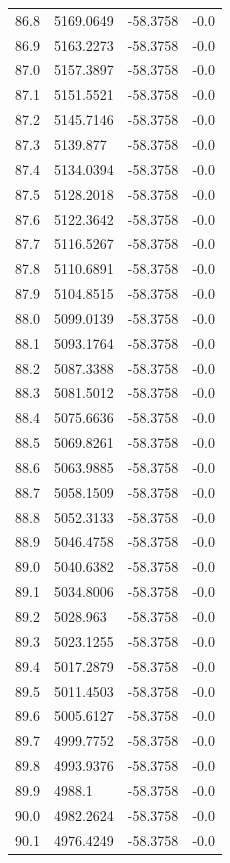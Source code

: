\begin{table}[H]
\begin{tabular}{llll}
86.8 & 5169.0649 & -58.3758 & -0.0 \\
86.9 & 5163.2273 & -58.3758 & -0.0 \\
87.0 & 5157.3897 & -58.3758 & -0.0 \\
87.1 & 5151.5521 & -58.3758 & -0.0 \\
87.2 & 5145.7146 & -58.3758 & -0.0 \\
87.3 & 5139.877 & -58.3758 & -0.0 \\
87.4 & 5134.0394 & -58.3758 & -0.0 \\
87.5 & 5128.2018 & -58.3758 & -0.0 \\
87.6 & 5122.3642 & -58.3758 & -0.0 \\
87.7 & 5116.5267 & -58.3758 & -0.0 \\
87.8 & 5110.6891 & -58.3758 & -0.0 \\
87.9 & 5104.8515 & -58.3758 & -0.0 \\
88.0 & 5099.0139 & -58.3758 & -0.0 \\
88.1 & 5093.1764 & -58.3758 & -0.0 \\
88.2 & 5087.3388 & -58.3758 & -0.0 \\
88.3 & 5081.5012 & -58.3758 & -0.0 \\
88.4 & 5075.6636 & -58.3758 & -0.0 \\
88.5 & 5069.8261 & -58.3758 & -0.0 \\
88.6 & 5063.9885 & -58.3758 & -0.0 \\
88.7 & 5058.1509 & -58.3758 & -0.0 \\
88.8 & 5052.3133 & -58.3758 & -0.0 \\
88.9 & 5046.4758 & -58.3758 & -0.0 \\
89.0 & 5040.6382 & -58.3758 & -0.0 \\
89.1 & 5034.8006 & -58.3758 & -0.0 \\
89.2 & 5028.963 & -58.3758 & -0.0 \\
89.3 & 5023.1255 & -58.3758 & -0.0 \\
89.4 & 5017.2879 & -58.3758 & -0.0 \\
89.5 & 5011.4503 & -58.3758 & -0.0 \\
89.6 & 5005.6127 & -58.3758 & -0.0 \\
89.7 & 4999.7752 & -58.3758 & -0.0 \\
89.8 & 4993.9376 & -58.3758 & -0.0 \\
89.9 & 4988.1 & -58.3758 & -0.0 \\
90.0 & 4982.2624 & -58.3758 & -0.0 \\
90.1 & 4976.4249 & -58.3758 & -0.0 \\

\end{tabular}
\end{table}
